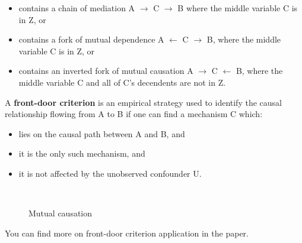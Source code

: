 \begin{itemize}

\item contains a chain of mediation A $\rightarrow$ C $\rightarrow$  B where the middle variable C is in Z, or

\item contains a fork of mutual dependence A $\leftarrow$ C $\rightarrow$ B, where the middle variable C is in Z, or

\item contains an inverted fork of mutual causation A $\rightarrow$ C $\leftarrow$  B, where the middle variable C and all of C's decendents are not in Z.

\end{itemize}

A \textbf{front-door criterion} is an empirical strategy used to identify the causal relationship flowing from A to B if one can find a mechanism C which:

\begin{itemize}

\item  lies on the causal path between A and B, and 

\item it is the only such mechanism, and 

\item it is not affected by the unobserved confounder U.

\end{itemize}

\begin{figure}[htp]\centering
\caption{Mutual causation}\
\end{figure}

You can find more on front-door criterion application in the \cite{Bellemare.2020} paper.

\nocite{Morgan.2014}
\nocite{Pearl.2009}





